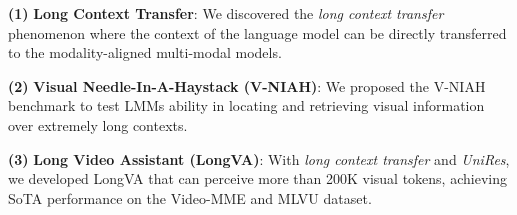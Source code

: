 \textbf{(1)} \textbf{Long Context Transfer}: We discovered the \textit{long context transfer} phenomenon where the context of the language model can be directly transferred to the modality-aligned multi-modal models.

\textbf{(2)} \textbf{Visual Needle-In-A-Haystack (V-NIAH)}: We proposed the V-NIAH benchmark to test LMMs ability in locating and retrieving visual information over extremely long contexts.

\textbf{(3)} \textbf{Long Video Assistant (LongVA)}: With \textit{long context transfer} and \textit{UniRes}, we developed LongVA that can perceive more than 200K visual tokens, achieving SoTA performance on the Video-MME and MLVU dataset. 

\begin{table}[t]
\begin{center}
\end{center}
\caption{To enable longer video inputs, previous works train 
 fewer visual tokens to increase the maximum frames during training. Our LongVA, on the other hand, enables long video capability by extending the backbone language model. \textsuperscript{*}We report it based on the best available information from their paper or released codebase.
}
\label{table:existing models}
\end{table}

